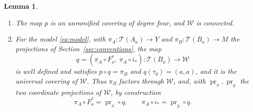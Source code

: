 \documentclass[11pt]{article}
\newcommand{\Teich}{\mathcal T}
\newcommand{\W}{\mathcal W}
\newcommand{\pr}{\operatorname{pr}}
\newtheorem{lemma}[theorem]{Lemma}
\theoremstyle{remark}
\numberwithin{equation}{section}
\begin{document}
\begin{lemma}\label{lem:cover}
\begin{enumerate}
\item The map $p$ is an unramified covering of degree four, and $\W$ is
connected.
\item For the model \eqref{eq:model}, with $\pi_A\colon\Teich(A_a)\to Y$
and $\pi_B\colon\Teich(B_a)\to M$ the projections of
Section~\ref{sec:conventions}, the map
\[
 q=(\pi_A\circ F_a^*,\ \pi_A\circ i_*)\colon\Teich(B_a)\longrightarrow\W
\]
is well defined and satisfies $p\circ q=\pi_B$ and $q(\tau_0)=(a,a)$, and
it is the universal covering of $\W$. Thus $\pi_B$ factors through $\W$,
and, with $\pr_x,\pr_y$ the two coordinate projections of $\W$, by
construction
\begin{equation}\label{eq:liftmaps}
 \pi_A\circ F_a^*=\pr_x\circ q,\qquad
 \pi_A\circ i_*=\pr_y\circ q .
\end{equation}
\end{enumerate}
\end{lemma}
\end{document}
